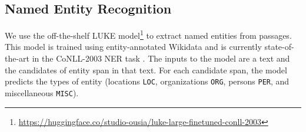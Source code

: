 \documentclass[letterpaper]{article} %
\begin{document}
\subsection{Named Entity Recognition}\label{sec:method_ner}
We use the off-the-shelf LUKE model\footnote{\url{https://huggingface.co/studio-ousia/luke-large-finetuned-conll-2003}} \citep{yamada-etal-2020-luke} to extract named entities from passages.
This model is trained using entity-annotated Wikidata and is currently state-of-the-art in the CoNLL-2003 NER task \citep{tjong-kim-sang-de-meulder-2003-introduction}.
The inputs to the model are a text and the candidates of entity span in that text.
For each candidate span, the model predicts the types of entity (locations \texttt{LOC}, organizations \texttt{ORG}, persons \texttt{PER}, and miscellaneous \texttt{MISC}).
\end{document}
